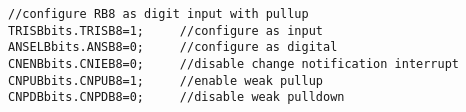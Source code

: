 \begin{lstlisting}[frame=htrbl, caption={Konfigurieren des Ports RB8 als Digitaler Input mit Pullup Widerstand}, label={lst:confregport}]
//configure RB8 as digit input with pullup
TRISBbits.TRISB8=1;     //configure as input
ANSELBbits.ANSB8=0;     //configure as digital
CNENBbits.CNIEB8=0;     //disable change notification interrupt
CNPUBbits.CNPUB8=1;     //enable weak pullup
CNPDBbits.CNPDB8=0;     //disable weak pulldown
\end{lstlisting}



